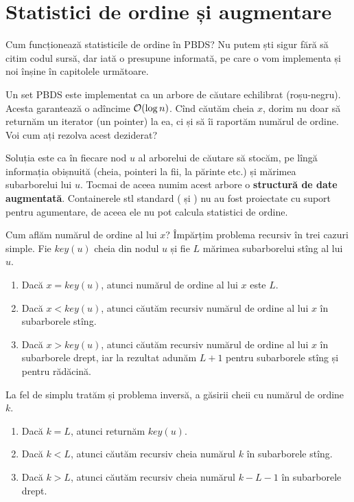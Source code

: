 \documentclass[../main.tex]{subfiles}
\begin{document}
\section{Statistici de ordine și augmentare}

Cum funcționează statisticile de ordine în PBDS? Nu putem ști sigur fără să citim codul sursă, dar iată o presupune informată, pe care o vom implementa și noi înșine în capitolele următoare.

Un set PBDS este implementat ca un arbore de căutare echilibrat (roșu-negru). Acesta garantează o adîncime $\mathcal{O}(\log n)$. Cînd căutăm cheia $x$, dorim nu doar să returnăm un iterator (un pointer) la ea, ci și să îi raportăm numărul de ordine. Voi cum ați rezolva acest deziderat?

Soluția este ca în fiecare nod $u$ al arborelui de căutare să stocăm, pe lîngă informația obișnuită (cheia, pointeri la fii, la părinte etc.) și mărimea subarborelui lui $u$. Tocmai de aceea numim acest arbore o \textbf{structură de date augmentată}. Containerele stl standard ( și ) nu au fost proiectate cu suport pentru agumentare, de aceea ele nu pot calcula statistici de ordine.

Cum aflăm numărul de ordine al lui $x$? Împărțim problema recursiv în trei cazuri simple. Fie $key(u)$ cheia din nodul $u$ și fie $L$ mărimea subarborelui stîng al lui $u$.

\begin{enumerate}
  \item Dacă $x = key(u)$, atunci numărul de ordine al lui $x$ este $L$.
  \item Dacă $x < key(u)$, atunci căutăm recursiv numărul de ordine al lui $x$ în subarborele stîng.
  \item Dacă $x > key(u)$, atunci căutăm recursiv numărul de ordine al lui $x$ în subarborele drept, iar la rezultat adunăm $L + 1$ pentru subarborele stîng și pentru rădăcină.
\end{enumerate}

La fel de simplu tratăm și problema inversă, a găsirii cheii cu numărul de ordine $k$.

\begin{enumerate}
  \item Dacă $k = L$, atunci returnăm $key(u)$.
  \item Dacă $k < L$, atunci căutăm recursiv cheia numărul $k$ în subarborele stîng.
  \item Dacă $k > L$, atunci căutăm recursiv cheia numărul $k - L - 1$ în subarborele drept.
\end{enumerate}
\end{document}
